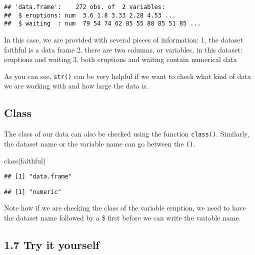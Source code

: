\documentclass[
]{book}
\newenvironment{Shaded}{\begin{snugshade}}{\end{snugshade}}
\newcommand{\FunctionTok}[1]{\textcolor[rgb]{0.00,0.00,0.00}{#1}}
\newcommand{\NormalTok}[1]{#1}
\newcommand{\SpecialCharTok}[1]{\textcolor[rgb]{0.00,0.00,0.00}{#1}}
\begin{document}
\begin{verbatim}
## 'data.frame':    272 obs. of  2 variables:
##  $ eruptions: num  3.6 1.8 3.33 2.28 4.53 ...
##  $ waiting  : num  79 54 74 62 85 55 88 85 51 85 ...
\end{verbatim}

In this case, we are provided with several pieces of information:
1. the dataset faithful is a data frame
2. there are two columns, or variables, in this dataset: eruptions and waiting
3. both eruptions and waiting contain numerical data

As you can see, \texttt{str()} can be very helpful if we want to check what kind of data we are working with and how large the data is.

\hypertarget{class}{%
\subsection{Class}\label{class}}

The class of our data can also be checked using the function \texttt{class()}. Similarly, the dataset name or the variable name can go between the \texttt{()}.

\begin{Shaded}
\begin{Highlighting}[]
\FunctionTok{class}\NormalTok{(faithful)}
\end{Highlighting}
\end{Shaded}

\begin{verbatim}
## [1] "data.frame"
\end{verbatim}

\begin{Shaded}
\end{Shaded}

\begin{verbatim}
## [1] "numeric"
\end{verbatim}

Note how if we are checking the class of the variable eruption, we need to have the dataset name followed by a \$ first before we can write the variable name.

\hypertarget{try-it-yourself-6}{%
\subsection{1.7 Try it yourself}\label{try-it-yourself-6}}
\end{document}
